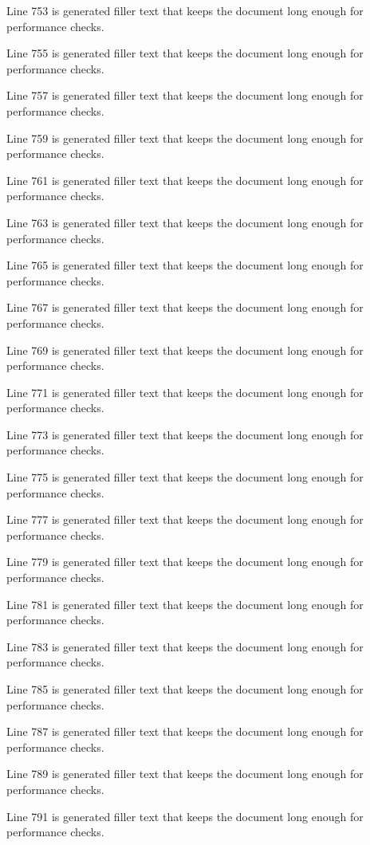 Line 753 is generated filler text that keeps the document long enough for performance checks.

Line 755 is generated filler text that keeps the document long enough for performance checks.

Line 757 is generated filler text that keeps the document long enough for performance checks.

Line 759 is generated filler text that keeps the document long enough for performance checks.

Line 761 is generated filler text that keeps the document long enough for performance checks.

Line 763 is generated filler text that keeps the document long enough for performance checks.

Line 765 is generated filler text that keeps the document long enough for performance checks.

Line 767 is generated filler text that keeps the document long enough for performance checks.

Line 769 is generated filler text that keeps the document long enough for performance checks.

Line 771 is generated filler text that keeps the document long enough for performance checks.

Line 773 is generated filler text that keeps the document long enough for performance checks.

Line 775 is generated filler text that keeps the document long enough for performance checks.

Line 777 is generated filler text that keeps the document long enough for performance checks.

Line 779 is generated filler text that keeps the document long enough for performance checks.

Line 781 is generated filler text that keeps the document long enough for performance checks.

Line 783 is generated filler text that keeps the document long enough for performance checks.

Line 785 is generated filler text that keeps the document long enough for performance checks.

Line 787 is generated filler text that keeps the document long enough for performance checks.

Line 789 is generated filler text that keeps the document long enough for performance checks.

Line 791 is generated filler text that keeps the document long enough for performance checks.

